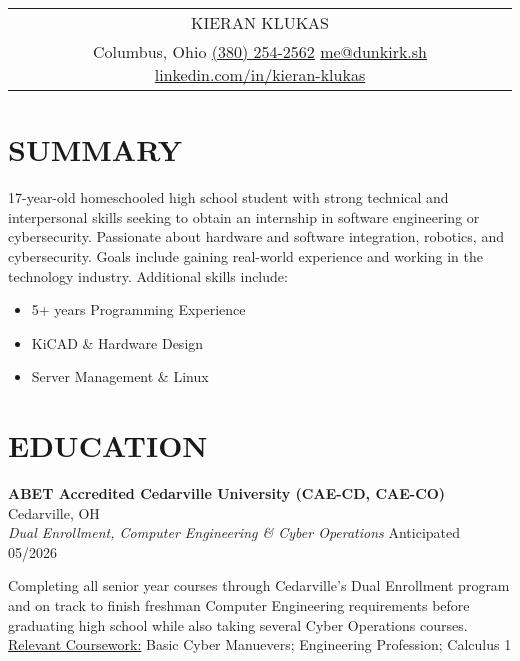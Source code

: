 \documentclass[a4paper,10pt]{article}
\newlength{\mpwidth}
\begin{document}
\pagestyle{empty}


\begin{tabularx}{\linewidth}{@{} C @{}}
\Huge{KIERAN KLUKAS} \\[8pt]
Columbus, Ohio \textbar{} \href{tel:3802542562}{(380) 254-2562} \textbar{} \href{mailto:me@dunkirk.sh}{me@dunkirk.sh} \textbar{} \href{https://linkedin.com/in/kieran-klukas}{linkedin.com/in/kieran-klukas}
\end{tabularx}

\section{SUMMARY}
17-year-old homeschooled high school student with strong technical and interpersonal skills seeking to obtain an internship in software engineering or cybersecurity. Passionate about hardware and software integration, robotics, and cybersecurity. Goals include gaining real-world experience and working in the technology industry. Additional skills include:
\begin{itemize}[nosep,leftmargin=1em, itemsep=3pt,label=$\bullet$]
\item 5+ years Programming Experience
\item KiCAD \& Hardware Design
\item Server Management \& Linux
\end{itemize}

\section{EDUCATION}

\textbf{ABET Accredited Cedarville University (CAE-CD, CAE-CO)} \hfill Cedarville, OH\\
\textit{Dual Enrollment, Computer Engineering \& Cyber Operations} \hfill Anticipated 05/2026\\
\begin{minipage}{\mpwidth}
Completing all senior year courses through Cedarville's Dual Enrollment program and on track to finish freshman Computer Engineering requirements before graduating high school while also taking several Cyber Operations courses.\\
\underline{Relevant Coursework:} Basic Cyber Manuevers; Engineering Profession; Calculus 1
\end{minipage}
\end{document}
